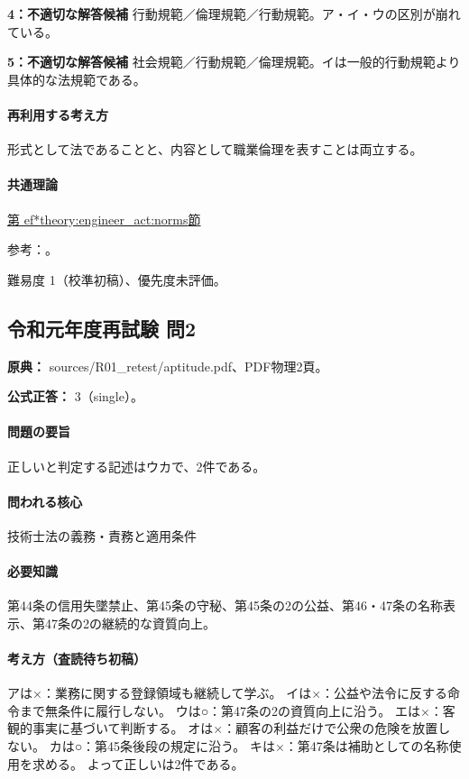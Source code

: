 \noindent\textbf{4：不適切な解答候補} 行動規範／倫理規範／行動規範。ア・イ・ウの区別が崩れている。\par

\noindent\textbf{5：不適切な解答候補} 社会規範／行動規範／倫理規範。イは一般的行動規範より具体的な法規範である。\par

\paragraph{再利用する考え方} 形式として法であることと、内容として職業倫理を表すことは両立する。

\paragraph{共通理論} \hyperref[theory:engineer_act:norms]{第
ef*{theory:engineer_act:norms}節}

\par 参考：\cite{engineer_act_current}。

\par 難易度 1（校準初稿）、優先度未評価。

\subsection{令和元年度再試験 問2}
\label{q:r01-ret-apt-02}

\noindent\textbf{原典：} sources/R01\_retest/aptitude.pdf、PDF物理2頁。

\textbf{公式正答：} 3（single）。

\paragraph{問題の要旨} 正しいと判定する記述はウカで、2件である。

\paragraph{問われる核心} 技術士法の義務・責務と適用条件

\paragraph{必要知識} 第44条の信用失墜禁止、第45条の守秘、第45条の2の公益、第46・47条の名称表示、第47条の2の継続的な資質向上。

\paragraph{考え方（査読待ち初稿）} アは×：業務に関する登録領域も継続して学ぶ。 イは×：公益や法令に反する命令まで無条件に履行しない。 ウは○：第47条の2の資質向上に沿う。 エは×：客観的事実に基づいて判断する。 オは×：顧客の利益だけで公衆の危険を放置しない。 カは○：第45条後段の規定に沿う。 キは×：第47条は補助としての名称使用を求める。 よって正しいは2件である。

